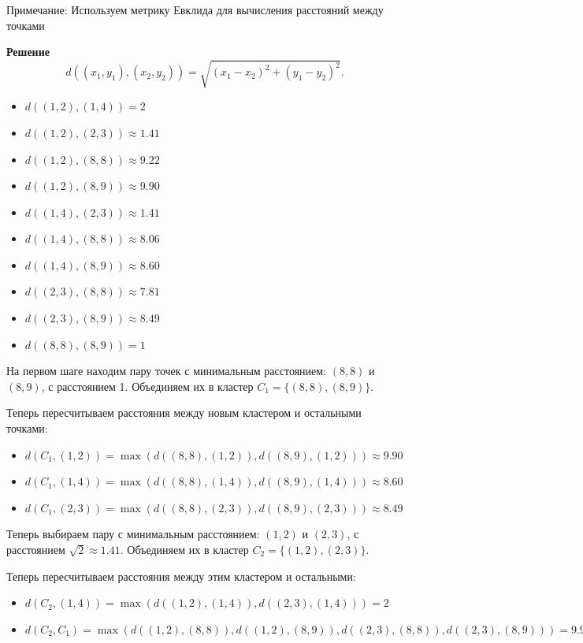 Примечание: Используем метрику Евклида для вычисления расстояний между точками

\textbf{Решение}
\[
d((x_1, y_1), (x_2, y_2)) = \sqrt{(x_1 - x_2)^2 + (y_1 - y_2)^2}.
\]

\begin{itemize}
    \item \( d((1, 2), (1, 4)) = 2 \)
    \item \( d((1, 2), (2, 3)) \approx 1.41 \)
    \item \( d((1, 2), (8, 8)) \approx 9.22 \)
    \item \( d((1, 2), (8, 9)) \approx 9.90 \)
    \item \( d((1, 4), (2, 3)) \approx 1.41 \)
    \item \( d((1, 4), (8, 8)) \approx 8.06 \)
    \item \( d((1, 4), (8, 9)) \approx 8.60 \)
    \item \( d((2, 3), (8, 8)) \approx 7.81 \)
    \item \( d((2, 3), (8, 9)) \approx 8.49 \)
    \item \( d((8, 8), (8, 9)) = 1 \)
\end{itemize}

На первом шаге находим пару точек с минимальным расстоянием: \( (8, 8) \) и \( (8, 9) \), с расстоянием 1. Объединяем их в кластер \( C_1 = \{(8, 8), (8, 9)\} \).

Теперь пересчитываем расстояния между новым кластером и остальными точками:
\begin{itemize}
    \item \( d(C_1, (1, 2)) = \max(d((8, 8), (1, 2)), d((8, 9), (1, 2))) \approx 9.90 \)
    \item \( d(C_1, (1, 4)) = \max(d((8, 8), (1, 4)), d((8, 9), (1, 4))) \approx 8.60 \)
    \item \( d(C_1, (2, 3)) = \max(d((8, 8), (2, 3)), d((8, 9), (2, 3))) \approx 8.49 \)
\end{itemize}

Теперь выбираем пару с минимальным расстоянием: \( (1, 2) \) и \( (2, 3) \), с расстоянием \( \sqrt{2} \approx 1.41 \). Объединяем их в кластер \( C_2 = \{(1, 2), (2, 3)\} \).

Теперь пересчитываем расстояния между этим кластером и остальными:
\begin{itemize}
    \item \( d(C_2, (1, 4)) = \max(d((1, 2), (1, 4)), d((2, 3), (1, 4))) = 2 \)
    \item \( d(C_2, C_1) = \max(d((1, 2), (8, 8)), d((1, 2), (8, 9)), d((2, 3), (8, 8)), d((2, 3), (8, 9))) = 9.90 \)
\end{itemize}

